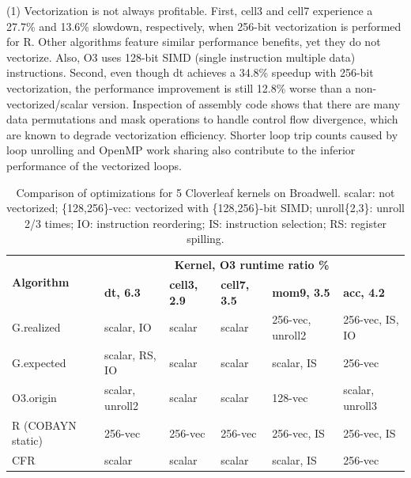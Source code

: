 \vspace{.25em}
\noindent (1) Vectorization is not always profitable. First, cell3
  and cell7 experience a 27.7\% and 13.6\% slowdown, respectively,
  when 256-bit vectorization is performed for R.  Other
  algorithms feature similar performance benefits, yet they do not
  vectorize.  Also, O3 uses 128-bit SIMD (single instruction multiple data) instructions.  Second, even though dt achieves a 34.8\%
  speedup with 256-bit vectorization, the performance improvement is
  still 12.8\% worse than a non-vectorized/scalar version. 
%
  Inspection of assembly code shows that there are many data permutations
  and mask operations to handle control flow divergence, which are
  known to degrade vectorization efficiency. Shorter loop trip counts
  caused by loop unrolling and OpenMP work sharing also
  contribute to the inferior performance of the vectorized loops.
\begin {table}
\caption{Comparison of optimizations for 5 Cloverleaf
kernels on Broadwell. scalar: not vectorized; \{128,256\}-vec: vectorized with
\{128,256\}-bit SIMD; unroll\{2,3\}: unroll 2/3 times; IO: instruction reordering;
IS: instruction selection; RS: register spilling.
}
\vspace{-2mm}
\label{table:study}
\centering
\begin{tabular}{l|l|l|l|l|l }
\hline
\multirow{2}{*}{\textbf{Algorithm}} &  \multicolumn{5}{c}{\textbf{Kernel, O3 runtime ratio \%}} \\
\cline{2-6}
 & \textbf{dt, 6.3} & \textbf{cell3, 2.9} & \textbf{cell7, 3.5} & \textbf{mom9, 3.5} &\textbf{acc,  4.2} \\
\hline
G.realized & scalar, IO & scalar & scalar & 256-vec, unroll2 &256-vec, IS, IO\\
\hline
G.expected & scalar, RS, IO & scalar & scalar & scalar, IS & 256-vec \\
\hline
O3.origin & scalar, unroll2 & scalar & scalar & 128-vec & scalar, unroll3\\
\hline
R (COBAYN static)& 256-vec & 256-vec & 256-vec & 256-vec, IS &256-vec, IS\\
\hline
CFR & scalar & scalar & scalar & scalar, IS& 256-vec\\
\hline
\end{tabular}
\vspace{-4mm}
\end {table}

